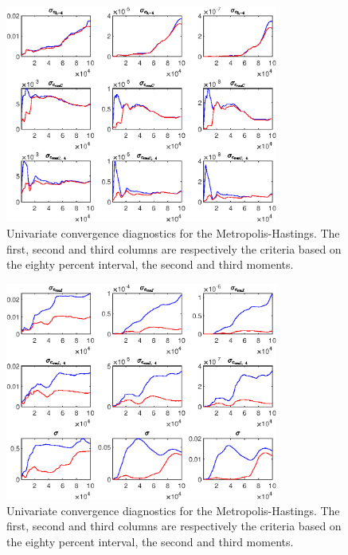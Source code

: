 \begin{figure}[H]
\centering 
\includegraphics[width=0.80\textwidth]{BRS_sectoral/Output/BRS_sectoral_udiag5}
\caption{Univariate convergence diagnostics for the Metropolis-Hastings.
The first, second and third columns are respectively the criteria based on
the eighty percent interval, the second and third moments.}\label{Fig:UnivariateDiagnostics:5}
\end{figure}

\begin{figure}[H]
\centering 
\includegraphics[width=0.80\textwidth]{BRS_sectoral/Output/BRS_sectoral_udiag6}
\caption{Univariate convergence diagnostics for the Metropolis-Hastings.
The first, second and third columns are respectively the criteria based on
the eighty percent interval, the second and third moments.}\label{Fig:UnivariateDiagnostics:6}
\end{figure}

